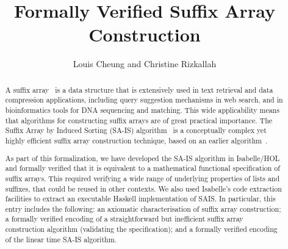 \documentclass[11pt,a4paper]{article}
\begin{document}
\title{Formally Verified Suffix Array Construction}
\author{Louis Cheung and Christine Rizkallah}
\maketitle

\begin{abstract}
A suffix array~\cite{Manber_SIAM_1993} is a data structure that is extensively used in text retrieval and data compression
applications, including query suggestion mechanisms in web search,
and in bioinformatics tools for DNA sequencing and matching.
This wide applicability means that algorithms for constructing suffix
arrays are of great practical importance.
The Suffix Array by Induced Sorting (SA-IS) algorithm~\cite{Nong_DCC_2009}  is a conceptually complex yet highly efficient
suffix array construction technique, based on an earlier algorithm~\cite{Ko_JDA_2005}. 

As part of this formalization, we have developed the SA-IS algorithm in Isabelle/HOL
and formally verified that it is equivalent to a mathematical
functional specification of suffix arrays. This required
verifying a wide range of underlying properties of lists and
suffixes, that could be reused in other contexts.
We also used Isabelle's code extraction facilities to extract an
executable Haskell implementation of SAIS. 
In particular, this entry includes the following:
an axiomatic characterisation of suffix array construction;
a formally verified encoding of a straightforward but inefficient suffix array construction algorithm (validating the specification);
and a formally verified encoding of the linear time SA-IS algorithm. 





\end{abstract}

\tableofcontents





\end{document}
